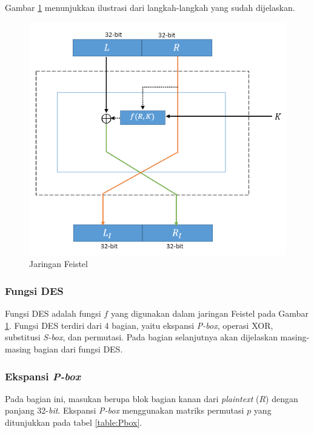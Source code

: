 Gambar \ref{fig:jaringanfeistel} menunjukkan ilustrasi dari langkah-langkah yang sudah dijelaskan.

\begin{figure}[H]
	\includegraphics[scale=0.6]{Gambar/jaringan_feistel}
	\centering
	\caption{Jaringan Feistel}\label{fig:jaringanfeistel}
\end{figure}

\subsubsection{Fungsi DES}

Fungsi DES adalah fungsi \begin{math}f\end{math} yang digunakan dalam jaringan Feistel pada Gambar \ref{fig:jaringanfeistel}. Fungsi DES terdiri dari 4 bagian, yaitu ekspansi \textit{P-box}, operasi XOR, substitusi \textit{S-box}, dan permutasi. Pada bagian selanjutnya akan dijelaskan masing-masing bagian dari fungsi DES.

\subsubsection{Ekspansi \textit{P-box}}

Pada bagian ini, masukan berupa blok bagian kanan dari \textit{plaintext} (\begin{math}R\end{math}) dengan panjang 32-\textit{bit}. Ekspansi \textit{P-box} menggunakan matriks permutasi \begin{math}p\end{math} yang ditunjukkan pada tabel \ref{table:Pbox}.

